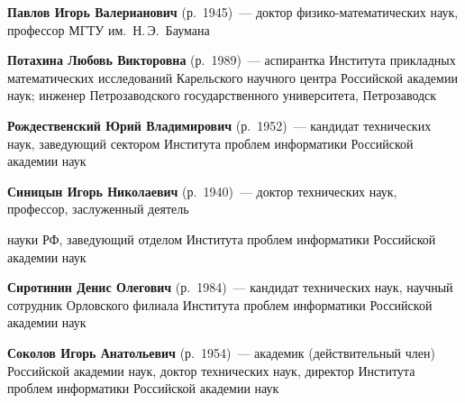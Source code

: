 \begin{multicols}{2}
\vspace*{3pt}

\noindent
\textbf{Павлов Игорь Валерианович} (р.\ 1945)~--- 
доктор фи\-зи\-ко-ма\-те\-ма\-ти\-че\-ских наук, профессор МГТУ им.\ Н.\,Э.~Баумана 


\vspace*{3pt}

\noindent 
\textbf{Потахина Любовь Викторовна} (р.\ 1989)~--- аспирантка
Института прикладных математических исследований Карельского научного центра
Российской академии наук; 
инженер Петрозаводского государственного университета, Петрозаводск

\vspace*{3pt}

\noindent 
\textbf{Рождественский Юрий Владимирович} (р.\ 1952)~--- 
кандидат технических наук, заведующий сектором Института проб\-лем информатики
Российской академии наук

\vspace*{3pt}

\noindent 
\textbf{Синицын Игорь Николаевич} (р.\ 1940)~--- доктор технических наук,
профессор, заслуженный деятель\linebreak\vspace*{-12pt}

\columnbreak

\noindent
 науки РФ, заведующий отделом Института проб\-лем информатики
Российской академии наук

\vspace*{7pt}


\noindent
\textbf{Сиротинин Денис Олегович} (р.\ 1984)~---
кандидат технических наук, научный сотрудник Орловского филиала Института проб\-лем информатики
Российской академии наук

\vspace*{7pt}


\noindent 
\textbf{Соколов  Игорь Анатольевич} (р.\ 1954)~--- академик (действительный член) Российской 
академии наук, доктор технических наук, директор Института проб\-лем информатики
Российской академии наук

\vspace*{7pt}


\end{multicols}
